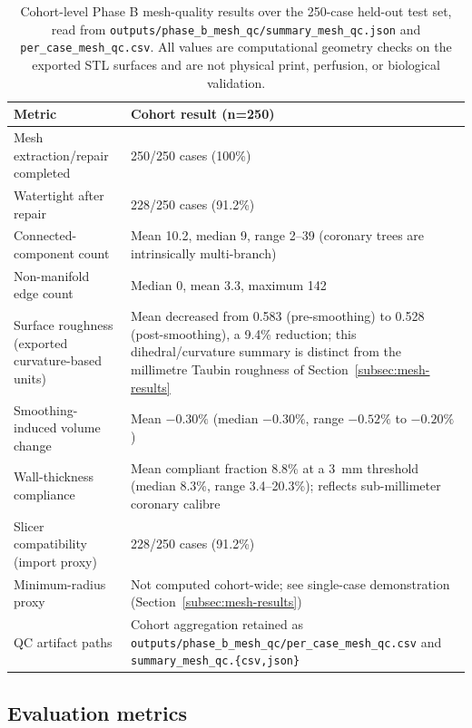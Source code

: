 \documentclass[anonymous]{iopjournal}
\begin{document}
\begin{table}[!t]
\centering
\caption{Cohort-level Phase B mesh-quality results over the 250-case held-out test set, read from \texttt{outputs/phase\_b\_mesh\_qc/summary\_mesh\_qc.json} and \texttt{per\_case\_mesh\_qc.csv}. All values are computational geometry checks on the exported STL surfaces and are not physical print, perfusion, or biological validation.}
\label{tab:phaseb-qc}
\begin{threeparttable}
\footnotesize
\begin{tabularx}{0.96\textwidth}{L{0.30\textwidth}Y}
\toprule
\textbf{Metric} & \textbf{Cohort result (n=250)} \\
\midrule
Mesh extraction/repair completed & 250/250 cases (100\%) \\
Watertight after repair & 228/250 cases (91.2\%) \\
Connected-component count & Mean 10.2, median 9, range 2--39 (coronary trees are intrinsically multi-branch) \\
Non-manifold edge count & Median 0, mean 3.3, maximum 142 \\
Surface roughness (exported curvature-based units) & Mean decreased from 0.583 (pre-smoothing) to 0.528 (post-smoothing), a 9.4\% reduction; this dihedral/curvature summary is distinct from the millimetre Taubin roughness of Section~\ref{subsec:mesh-results} \\
Smoothing-induced volume change & Mean $-0.30\%$ (median $-0.30\%$, range $-0.52\%$ to $-0.20\%$) \\
Wall-thickness compliance & Mean compliant fraction 8.8\% at a \SI{3}{mm} threshold (median 8.3\%, range 3.4--20.3\%); reflects sub-millimeter coronary calibre \\
Slicer compatibility (import proxy) & 228/250 cases (91.2\%) \\
Minimum-radius proxy & Not computed cohort-wide; see single-case demonstration (Section~\ref{subsec:mesh-results}) \\
QC artifact paths & Cohort aggregation retained as \texttt{outputs/phase\_b\_mesh\_qc/per\_case\_mesh\_qc.csv} and \texttt{summary\_mesh\_qc.\{csv,json\}} \\
\bottomrule
\end{tabularx}
\end{threeparttable}
\end{table}

\subsection{Evaluation metrics}
\label{subsec:metrics}
\end{document}
